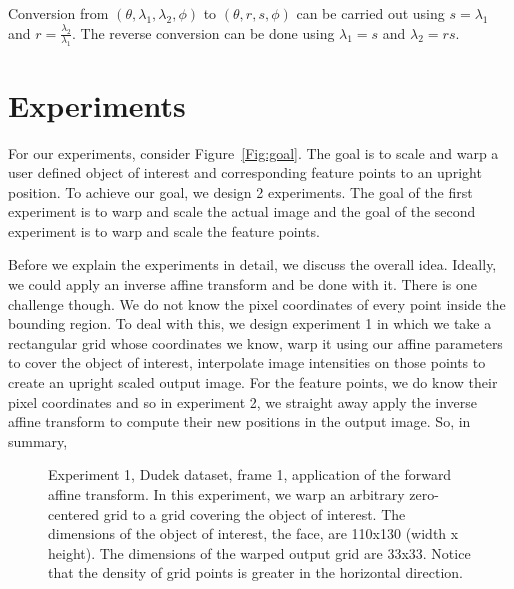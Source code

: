 Conversion from $(\theta, \lambda_1, \lambda_2, \phi)$ to $(\theta, r, s, \phi)$ can be carried out using $s=\lambda_1$ and $r=\frac{\lambda_2}{\lambda_1}$.  The reverse conversion can be done using $\lambda_1=s$ and $\lambda_2=rs$.

\section{Experiments}
For our experiments, consider Figure~\ref{Fig:goal}.  The goal is to scale and warp a user defined object of interest and corresponding feature points to an upright position.  To achieve our goal, we design 2 experiments.  The goal of the first experiment is to warp and scale the actual image and the goal of the second experiment is to warp and scale the feature points.

Before we explain the experiments in detail, we discuss the overall idea.  Ideally, we could apply an inverse affine transform and be done with it.  There is one challenge though.  We do not know the pixel coordinates of every point inside the bounding region.  To deal with this, we design experiment 1 in which we take a rectangular grid whose coordinates we know, warp it using our affine parameters to cover the object of interest, interpolate image intensities on those points to create an upright scaled output image.  For the feature points, we do know their pixel coordinates and so in experiment 2, we straight away apply the inverse affine transform to compute their new positions in the output image.  So, in summary,

								\begin{figure}[t]
								\centering
								\caption{Experiment 1, Dudek dataset, frame 1, application of the forward affine transform.  In this experiment, we warp an arbitrary zero-centered grid to a grid covering the object of interest.  The dimensions of the object of interest, the face, are 110x130 (width x height).  The dimensions of the warped output grid are 33x33.  Notice that the density of grid points is greater in the horizontal direction.}
								\label{fig:experiment1}
								\end{figure}



